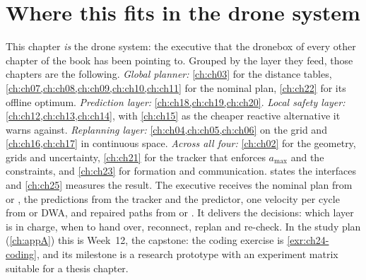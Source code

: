 \section{Where this fits in the drone system}
\label{sec:ch24-drone}
\begin{dronebox}
This chapter \emph{is} the drone system: the executive that the dronebox of
every other chapter of the book has been pointing to. Grouped by the layer
they feed, those chapters are the following. \emph{Global planner:}
\cref{ch:ch03} for the distance tables, \cref{ch:ch07,ch:ch08,ch:ch09,ch:ch10,ch:ch11}
for the nominal plan, \cref{ch:ch22} for its offline optimum.
\emph{Prediction layer:} \cref{ch:ch18,ch:ch19,ch:ch20}. \emph{Local safety
layer:} \cref{ch:ch12,ch:ch13,ch:ch14}, with \cref{ch:ch15} as the cheaper
reactive alternative it warns against. \emph{Replanning layer:}
\cref{ch:ch04,ch:ch05,ch:ch06} on the grid and \cref{ch:ch16,ch:ch17} in
continuous space. \emph{Across all four:} \cref{ch:ch02} for the geometry,
grids and uncertainty, \cref{ch:ch21} for the tracker that enforces
$a_{\max}$ and the constraints, and \cref{ch:ch23} for formation and
communication.  states the interfaces and \cref{ch:ch25}
measures the result. The executive receives the nominal plan from \cbs or
\ecbs, the predictions from the tracker and the predictor, one velocity per
cycle from \orca or DWA, and repaired paths from \dstarlite or \astar. It
delivers the decisions: which layer is in charge, when to hand over,
reconnect, replan and re-check. In the study plan
(\cref{ch:appA}) this is Week~12, the capstone: the coding exercise is
\cref{exr:ch24-coding}, and its milestone is a research prototype with an
experiment matrix suitable for a thesis chapter.
\end{dronebox}

